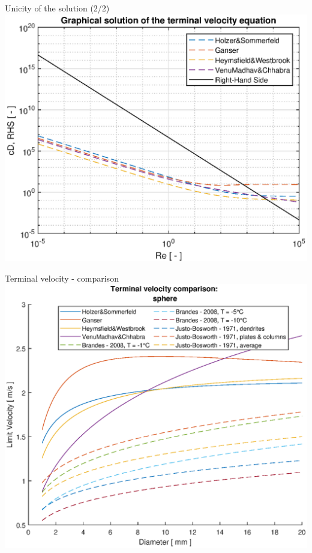 \documentclass[11pt]{beamer}
\begin{document}
	\begin{frame}{Unicity of the solution (2/2)}
		\centering
		\includegraphics[height=\textheight,width=\textwidth,keepaspectratio] {unicity_max.eps}		
	\end{frame}

	\begin{frame}{Terminal velocity - comparison}
		\centering
		\includegraphics[height=\textheight,width=\textwidth,keepaspectratio] {vt_sphere.eps}		
	\end{frame}
\end{document}
